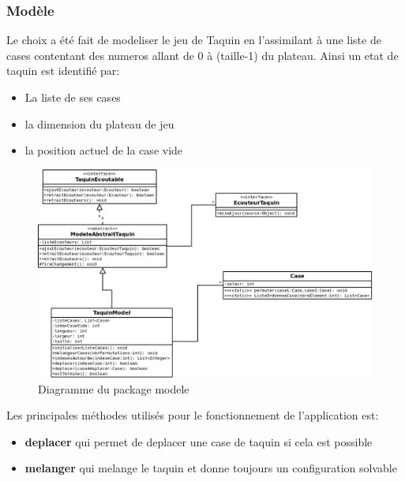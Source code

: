 \documentclass[12pt]{article}
\begin{document}
\subsubsection*{Modèle}
Le choix a été fait de modeliser le jeu de Taquin en l'assimilant à une liste de cases contentant des numeros allant de
0 à (taille-1) du plateau. Ainsi un etat de taquin est identifié par:
\begin{itemize}
	\item La liste de ses cases
	\item la dimension du plateau de jeu 
	\item la position actuel de la case vide
\end{itemize}

\begin{figure}[h!]
	\centering
	\includegraphics[scale=0.5]{images/DiagrammeModele.png}
	\caption{Diagramme du package modele}
\end{figure}
\newpage

Les principales méthodes utilisés pour le fonctionnement de l'application est:
\begin{itemize}
	\item \textbf{deplacer} qui permet de deplacer une case de taquin si cela est possible
	\item \textbf{melanger} qui melange le taquin et donne toujours un configuration solvable
\end{itemize}
\end{document}
